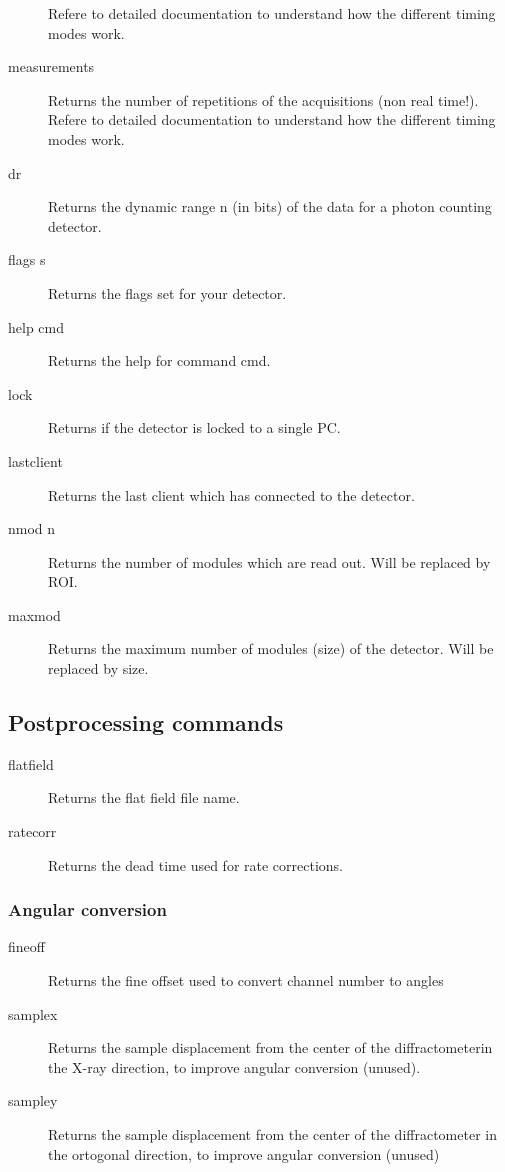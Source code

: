 \documentclass{article}
\begin{document}
\begin{description}
Refere to detailed documentation to understand how the different timing modes work.
\item[measurements] Returns the number of repetitions of the acquisitions (non real time!). 
Refere to detailed documentation to understand how the different timing modes work.
\item[dr] Returns the dynamic range n (in bits) of the data for a photon counting detector. 
\item[flags s] Returns the flags set for your detector. 
\item[help cmd]  Returns the help for command cmd.
\item[lock] Returns if the detector is locked to a single PC.
\item[lastclient] Returns the last client which has connected to the detector.
\item[nmod n] Returns the number of modules which are read out. Will be replaced by ROI.
\item[maxmod] Returns the maximum number of modules (size) of the detector.  Will be replaced by size.
\end{description}








\subsection{Postprocessing commands}
\begin{description}      
\item[flatfield] Returns the flat field file name. 
\item[ratecorr] Returns the dead time used for rate corrections.
\end{description}


\subsubsection{Angular conversion}

\begin{description}
\item[fineoff] Returns the fine offset used to convert channel number to angles
\item[samplex] Returns the sample displacement from the center of the diffractometerin the X-ray direction, to improve angular conversion (unused).
\item[sampley] Returns the sample displacement from the center of the diffractometer in the ortogonal direction, to improve angular conversion (unused)
\end{description}
\end{document}

